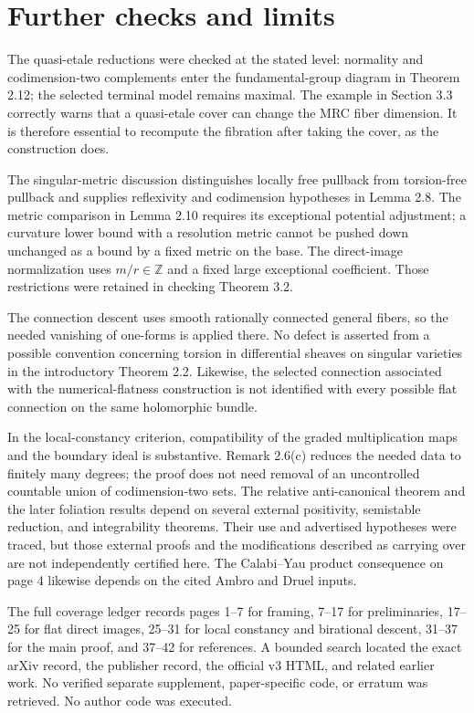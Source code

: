 \documentclass[10pt]{article}
\begin{document}
\section*{Further checks and limits}
The quasi-etale reductions were checked at the stated level: normality and codimension-two complements enter the fundamental-group diagram in Theorem 2.12; the selected terminal model remains maximal. The example in Section 3.3 correctly warns that a quasi-etale cover can change the MRC fiber dimension. It is therefore essential to recompute the fibration after taking the cover, as the construction does.\par
The singular-metric discussion distinguishes locally free pullback from torsion-free pullback and supplies reflexivity and codimension hypotheses in Lemma 2.8. The metric comparison in Lemma 2.10 requires its exceptional potential adjustment; a curvature lower bound with a resolution metric cannot be pushed down unchanged as a bound by a fixed metric on the base. The direct-image normalization uses \(m/r\in\mathbb Z\) and a fixed large exceptional coefficient. Those restrictions were retained in checking Theorem 3.2.\par
The connection descent uses smooth rationally connected general fibers, so the needed vanishing of one-forms is applied there. No defect is asserted from a possible convention concerning torsion in differential sheaves on singular varieties in the introductory Theorem 2.2. Likewise, the selected connection associated with the numerical-flatness construction is not identified with every possible flat connection on the same holomorphic bundle.\par
In the local-constancy criterion, compatibility of the graded multiplication maps and the boundary ideal is substantive. Remark 2.6(c) reduces the needed data to finitely many degrees; the proof does not need removal of an uncontrolled countable union of codimension-two sets. The relative anti-canonical theorem and the later foliation results depend on several external positivity, semistable reduction, and integrability theorems. Their use and advertised hypotheses were traced, but those external proofs and the modifications described as carrying over are not independently certified here. The Calabi–Yau product consequence on page 4 likewise depends on the cited Ambro and Druel inputs.\par
The full coverage ledger records pages 1–7 for framing, 7–17 for preliminaries, 17–25 for flat direct images, 25–31 for local constancy and birational descent, 31–37 for the main proof, and 37–42 for references. A bounded search located the exact arXiv record, the publisher record, the official v3 HTML, and related earlier work. No verified separate supplement, paper-specific code, or erratum was retrieved. No author code was executed.\par
\end{document}
